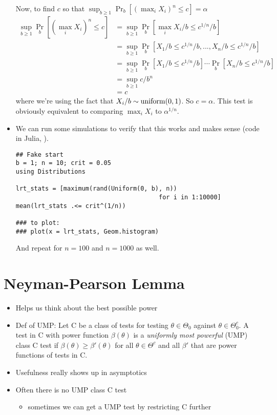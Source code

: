 \begin{itemize}[leftmargin=0pt]
\begin{ex}
    Now, to find $c$ so that $\sup_{b \geq 1} \Pr_b[(\max_i X_i)^n \leq c] = \alpha$
    \begin{align*}
      \sup_{b \geq 1} \Pr_b[(\max_i X_i)^n \leq c]
      &= \sup_{b\geq 1} \Pr_b[\max_i X_i/b \leq c^{1/n}/b] \\
      &= \sup_{b \geq 1} \Pr_b[X_1/b \leq c^{1/n}/b, ..., X_n/b \leq c^{1/n}/b] \\
      &= \sup_{b \geq 1} \Pr_b[X_1/b \leq c^{1/n}/b] \cdots \Pr_b[X_n/b \leq c^{1/n}/b] \\
      &= \sup_{b \geq 1} c/b^n \\
      &= c
    \end{align*}
    where we're using the fact that $X_i/b \sim \operatorname{uniform}(0,1)$.  So
    $c=\alpha$.  This test is obviously equivalent to comparing $\max_i
    X_i$ to $\alpha^{1/n}$.
  \end{ex}

\item We can run some simulations to verify that this works and makes
  sense (code in Julia, \citealp{BKS12}).
  \renewcommand*\FancyVerbStartString{## Fake start}
  \begin{Verbatim}
## Fake start
b = 1; n = 10; crit = 0.05
using Distributions

lrt_stats = [maximum(rand(Uniform(0, b), n))
                                       for i in 1:10000]
mean(lrt_stats .<= crit^(1/n))

### to plot:
### plot(x = lrt_stats, Geom.histogram)
  \end{Verbatim}
  And repeat for $n = 100$ and $n = 1000$ as well.
\end{itemize}

\section{Neyman-Pearson Lemma}

\begin{itemize}[leftmargin=0pt]
\item Helps us think about the best possible power
\item Def of UMP: Let C be a class of tests for testing $\theta \in \Theta_0$
  against $\theta \in \Theta_0^c$.  A test in C with power function $\beta(\theta)$ is a
  \emph{uniformly most powerful} (UMP) class C test if $\beta(\theta) \geq \beta'(\theta)$
  for all $\theta \in \Theta^c$ and all $\beta'$ that are power functions of tests in
  C.
\item Usefulness really shows up in asymptotics
\item Often there is no UMP class C test
\begin{itemize}
\item sometimes we can get a UMP test by restricting C further
\end{itemize}
\end{itemize}

